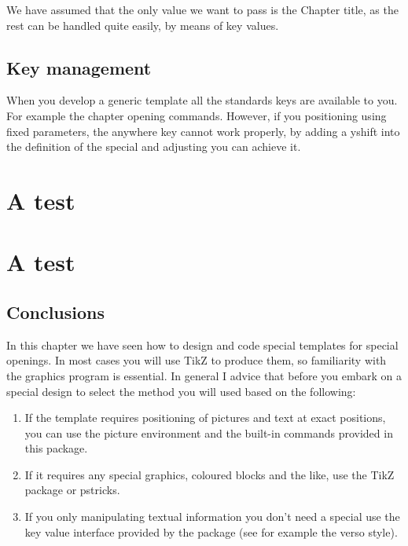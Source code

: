 We have assumed that the only value we want to pass is the Chapter title, as the rest can be handled quite easily, by means of key values.

\section{Key management}

When you develop a generic template all the standards keys are available to you. For example the chapter opening commands. However, if you positioning using fixed parameters, the anywhere key cannot work properly, by adding a yshift into the definition of the special and adjusting you can achieve it.

\clearpage

\chapter{A test}
\chapter{A test}

\section{Conclusions}

In this chapter we have seen how to design and code special templates for special openings. In most cases you will use TikZ to produce them, so familiarity with the graphics program is essential. In general I advice that before you embark on a special design to select the method you will used based on the following:

\begin{enumerate}
\item If the template requires positioning of pictures and text at exact positions, you can use the 
        picture environment and the built-in commands provided in this package.
\item If it requires any special graphics, coloured blocks and the like, use the TikZ package or pstricks.
\item If you only manipulating textual information you don't need a special use the key value interface provided by the package (see for example the verso style).
\end{enumerate}
 
















